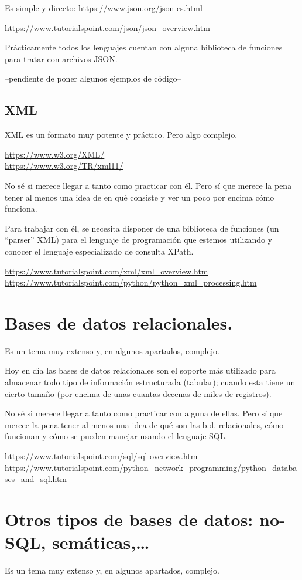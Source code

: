 \documentclass[spanish,12pt,a4paper,final,oneside]{book}
\begin{document}
Es simple y directo:  \url{https://www.json.org/json-es.html}

\url{https://www.tutorialspoint.com/json/json_overview.htm}

Prácticamente todos los lenguajes cuentan con alguna biblioteca de funciones para tratar con archivos JSON.

--pendiente de poner algunos ejemplos de código--


\subsection{XML}
XML es un formato muy potente y práctico. Pero algo complejo.

\url{https://www.w3.org/XML/}
\\ \url{https://www.w3.org/TR/xml11/}

No sé si merece llegar a tanto como practicar con él. Pero sí que merece la pena tener al menos una idea de en qué consiste y ver un poco por encima cómo funciona.

Para trabajar con él, se necesita disponer de una biblioteca de funciones (un ``parser'' XML) para el lenguaje de programación que estemos utilizando y conocer el lenguaje especializado de consulta XPath.

\url{https://www.tutorialspoint.com/xml/xml_overview.htm}
\\ \url{https://www.tutorialspoint.com/python/python_xml_processing.htm}


\section{Bases de datos relacionales.}
Es un tema muy extenso y, en algunos apartados, complejo.

Hoy en día las bases de datos relacionales son el soporte más utilizado para almacenar todo tipo de información estructurada (tabular); cuando esta tiene un cierto tamaño (por encima de unas cuantas decenas de miles de registros).

No sé si merece llegar a tanto como practicar con alguna de ellas. Pero sí que merece la pena tener al menos una idea de qué son las b.d. relacionales, cómo funcionan y cómo se pueden manejar usando el lenguaje SQL.

\url{https://www.tutorialspoint.com/sql/sql-overview.htm}
\url{https://www.tutorialspoint.com/python_network_programming/python_databases_and_sql.htm}


\section{Otros tipos de bases de datos: no-SQL, semáticas,\ldots}
Es un tema muy extenso y, en algunos apartados, complejo.
\end{document}
